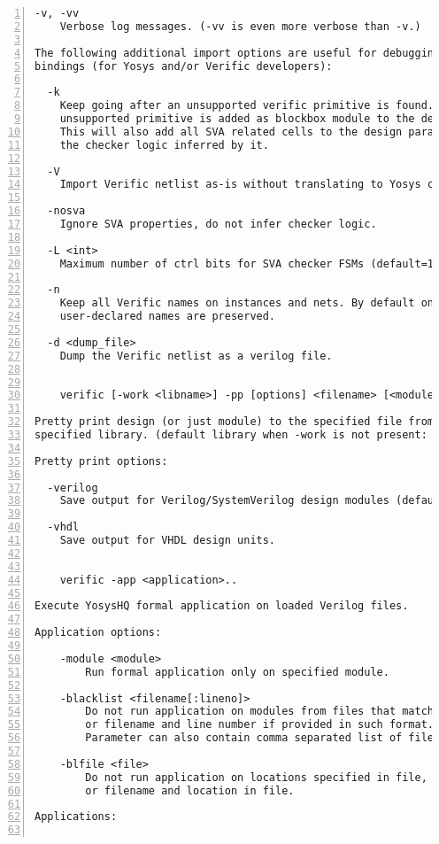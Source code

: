 \begin{lstlisting}[numbers=left,frame=single]
  -v, -vv
    Verbose log messages. (-vv is even more verbose than -v.)

The following additional import options are useful for debugging the Verific
bindings (for Yosys and/or Verific developers):

  -k
    Keep going after an unsupported verific primitive is found. The
    unsupported primitive is added as blockbox module to the design.
    This will also add all SVA related cells to the design parallel to
    the checker logic inferred by it.

  -V
    Import Verific netlist as-is without translating to Yosys cell types. 

  -nosva
    Ignore SVA properties, do not infer checker logic.

  -L <int>
    Maximum number of ctrl bits for SVA checker FSMs (default=16).

  -n
    Keep all Verific names on instances and nets. By default only
    user-declared names are preserved.

  -d <dump_file>
    Dump the Verific netlist as a verilog file.


    verific [-work <libname>] -pp [options] <filename> [<module>]..

Pretty print design (or just module) to the specified file from the
specified library. (default library when -work is not present: "work")

Pretty print options:

  -verilog
    Save output for Verilog/SystemVerilog design modules (default).

  -vhdl
    Save output for VHDL design units.


    verific -app <application>..

Execute YosysHQ formal application on loaded Verilog files.

Application options:

    -module <module>
        Run formal application only on specified module.

    -blacklist <filename[:lineno]>
        Do not run application on modules from files that match the filename
        or filename and line number if provided in such format.
        Parameter can also contain comma separated list of file locations.

    -blfile <file>
        Do not run application on locations specified in file, they can represent filename
        or filename and location in file.

Applications:


\end{lstlisting}
